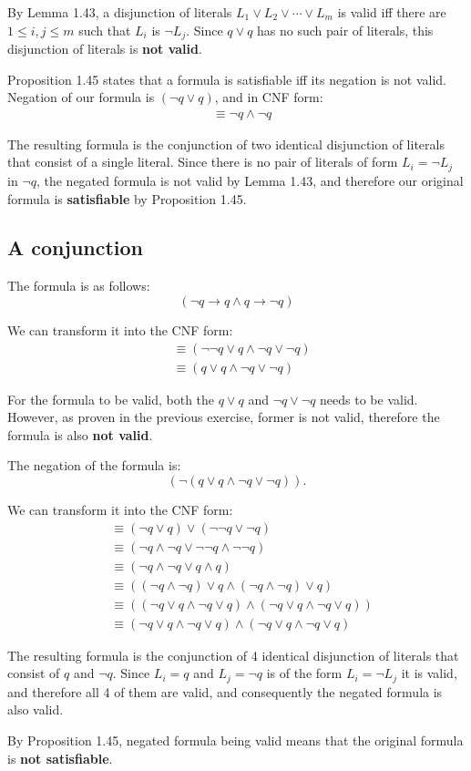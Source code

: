 \documentclass{article}
\newcommand{\imp}{\ensuremath{\rightarrow}}
\newcommand{\fneg}[1]{\ensuremath{\left(\neg #1 \right)}}
\newcommand{\fland}[2]{\ensuremath{\left( #1 \land #2 \right)}}
\newcommand{\flor}[2]{\ensuremath{\left( #1 \lor #2 \right)}}
\newcommand{\FlanD}[2]{\ensuremath{#1 \land #2}}
\newcommand{\FloR}[2]{\ensuremath{#1 \lor #2}}
\newcommand{\floR}[2]{\ensuremath{\left( #1 \right) \lor #2}}
\begin{document}
By Lemma 1.43, a disjunction of literals
$L_1 \lor L_2 \lor \dotsb \lor L_m$ is valid iff there are
$1 \leq i, j \leq m$ such that $L_i$ is $\neg L_j$.
Since $q \lor q$ has no such pair of literals,
this disjunction of literals is \textbf{not valid}.

Proposition 1.45 states that a formula is satisfiable iff
its negation is not valid. Negation of our formula is
$\fneg{q \lor q}$, and in CNF form:
\begin{align*}
&\equiv \neg q \land \neg q
\end{align*}

The resulting formula is the conjunction of two identical
disjunction of literals that consist of a single literal.
Since there is no pair of literals of form $L_i = \neg L_j$ in
$\neg q$, the negated formula is not valid by Lemma 1.43, and therefore
our original formula is \textbf{satisfiable} by Proposition 1.45.

\subsection{A conjunction}
The formula is as follows:
$$
\fland{\neg q \imp q}{q \imp \neg q}
$$

We can transform it into the CNF form:
\begin{align*}
&\equiv \fland{\neg\neg q \lor q}{\neg q \lor \neg q}\\
&\equiv \fland{q \lor q}{\neg q \lor \neg q}
\end{align*}

For the formula to be valid, both the $q \lor q$ and
$\neg q \lor \neg q$ needs to be valid. However, as proven in
the previous exercise, former is not valid, therefore the
formula is also \textbf{not valid}.

The negation of the formula is:
$$
\fneg{\fland{q \lor q}{\neg q \lor \neg q}}.
$$

We can transform it into the CNF form:
\begin{align*}
&\equiv \FloR{\fneg{q \lor q}}{\fneg{\neg q \lor \neg q}}\\
&\equiv \flor{\neg q \land \neg q}{\neg\neg q \land \neg\neg q}\\
&\equiv \flor{\neg q \land \neg q}{q \land q}\\
&\equiv \fland{\floR{\neg q \land \neg q}{q}}{\floR{\neg q \land \neg q}{q}}\\
&\equiv \fland{\fland{\neg q \lor q}{\neg q \lor q}}{\fland{\neg q \lor q}{\neg q \lor q}}\\
&\equiv \FlanD{\fland{\neg q \lor q}{\neg q \lor q}}{\fland{\neg q \lor q}{\neg q \lor q}}
\end{align*}

The resulting formula is the conjunction of 4 identical
disjunction of literals that consist of $q$ and $\neg q$.
Since $L_i = q$ and $L_j = \neg q$ is of the form $L_i = \neg L_j$
it is valid, and therefore all 4 of them are valid, and consequently
the negated formula is also valid.

By Proposition 1.45, negated formula being valid means that
the original formula is \textbf{not satisfiable}.
\end{document}
